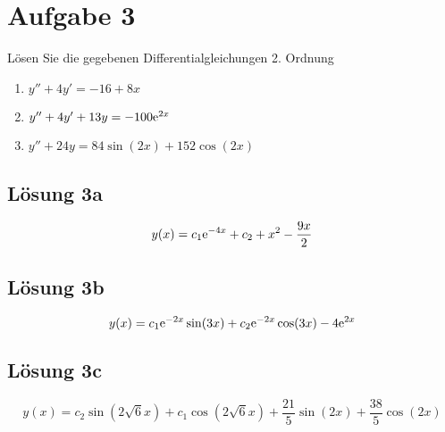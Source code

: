 \documentclass[main.tex]{subfiles}
\begin{document}
\section{Aufgabe 3}
Lösen Sie die gegebenen Differentialgleichungen 2. Ordnung
\begin{enumerate}
    \item $y'' + 4y' = -16 + 8x$
    \item $y'' + 4y' + 13y = -100\mathrm{e}^{2x}$
    \item $y'' + 24y = 84\sin(2x) + 152\cos(2x)$
\end{enumerate}

\subsection{Lösung 3a}

$$
    y(x) = c_1 \mathrm{e}^{-4 x} + c_2 + x^2 - \frac{9 x}{2}
$$

\subsection{Lösung 3b}
$$
    y(x) = c_1 \mathrm{e}^{-2 x} \sin(3 x) + c_2 \mathrm{e}^{-2 x} \cos(3 x) - 4 \mathrm{e}^{2 x}
$$

\subsection{Lösung 3c}

$$
    y(x) = c_2 \sin(2 \sqrt{6} x) + c_1 \cos(2 \sqrt{6} x) + \frac{21}{5} \sin(2 x) + \frac{38}{5} \cos(2 x)
$$
\end{document}
